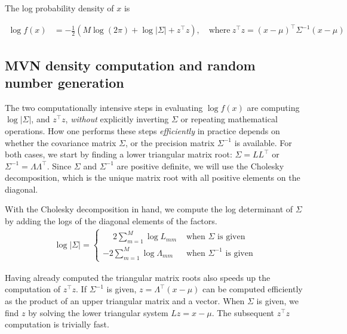 \documentclass[codesnippet]{jss}\usepackage[]{graphicx}\usepackage[]{color}
\begin{document}
The log probability density of $x$ is

\begin{align}
\log f(x)&=-\frac{1}{2}\left(M \log (2\pi) + \log|\Sigma|
  +z^\top z\right),\quad\text{where}~z^\top z=\left(x-\mu\right)^\top\Sigma^{-1}\left(x-\mu\right)
 \end{align}

\subsection{MVN density computation and random number generation}\label{sec:algorithms}

The two computationally intensive steps in evaluating $\log f(x)$ are
computing $\log|\Sigma|$, and $z^\top z$, \emph{without} explicitly
inverting $\Sigma$ or repeating mathematical operations.  How one
performs these steps \emph{efficiently} in practice depends on whether the
covariance matrix $\Sigma$, or the precision matrix $\Sigma^{-1}$ is
available. For both cases, we start by finding a lower triangular matrix root:
$\Sigma=LL^\top$ or $\Sigma^{-1}=\Lambda\Lambda^\top$.  Since $\Sigma$
and $\Sigma^{-1}$ are positive definite, we will use the Cholesky
decomposition, which is the unique matrix root with all positive
elements on the diagonal.

With the Cholesky decomposition in hand, we compute the log
determinant of $\Sigma$ by adding the logs of the diagonal elements of
the factors.
\begin{align}
  \label{eq:logDet}
  \log|\Sigma|= \begin{cases}
    \phantom{-}2\sum_{m=1}^M\log L_{mm}&\text{ when $\Sigma$ is given}\\
    -2\sum_{m=1}^M\log \Lambda_{mm}&\text{ when $\Sigma^{-1}$ is given}
    \end{cases}
\end{align}

Having already computed the triangular matrix roots also speeds up the computation of
$z^\top z$.  If $\Sigma^{-1}$ is given, $z=\Lambda^\top(x-\mu)$ can be computed
efficiently as the product of an upper triangular matrix and a
vector. When $\Sigma$ is given, we find $z$ by solving the lower
triangular system $Lz=x-\mu$.  The subsequent $z^\top z$
computation is trivially fast.
\end{document}
